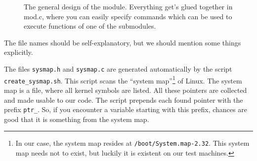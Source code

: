 \documentclass[10pt, letterpaper]{scrartcl}
\begin{document}
 \begin{figure}[ht]
  \centering
  
  \caption{The general design of the module. Everything get's glued together in mod.c, where you can easily specify commands which can be used to execute functions of one of the submodules.}
  \label{fig:module-decomposition}
\end{figure}
The file names should be self-explanatory, but we should mention some things explicitly.

The files \texttt{sysmap.h} and \texttt{sysmap.c} are generated automatically by the script \linebreak \texttt{create\_sysmap.sh}. This script scans the ``system map''\footnote{In our case, the system map resides at \texttt{/boot/System.map-2.32}. This system map needs not to exist, but luckily it is existent on our test machines.} of Linux. The system map is a file, where all kernel symbols are listed. All these pointers are collected and made usable to our code. The script prepends each found pointer with the prefix \texttt{ptr\_}. So, if you encounter a variable starting with this prefix, chances are good that it is something from the system map.
\end{document}
